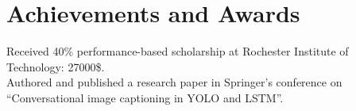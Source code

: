 \documentclass[letterpaper,10.5pt]{article}
\begin{document}
\section{Achievements and Awards}
 \begin{itemize}[leftmargin=0.15in, label={}]
    \small{\item{{Received 40\% performance-based scholarship at Rochester Institute of Technology: 27000\$.} \\{Authored and published a research paper in Springer’s conference on “Conversational image captioning in YOLO and LSTM”.} \\
    }}
 \end{itemize}


\end{document}
